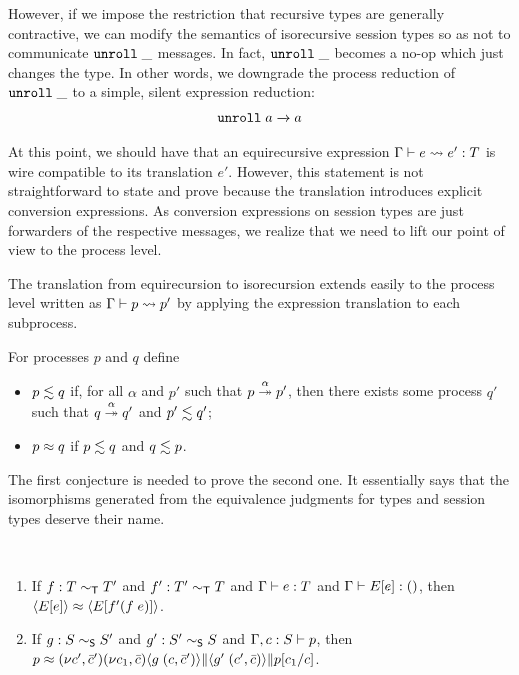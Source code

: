 However, if we impose the restriction that recursive types are
generally contractive, we can modify the semantics of isorecursive
session types so as not to communicate $\EUnroll\_$ messages. In fact,
$\EUnroll\_$ becomes a no-op which just changes the type. In other
words, we downgrade the process reduction of $\EUnroll\_$ to a simple,
silent expression reduction:
\begin{gather*}
  \reduce{\EUnroll a}{a}
\end{gather*}

At this point, we should have that an equirecursive expression
$\translation e{e'} T$ is wire compatible to its translation
$e'$. However, this statement is not straightforward to state and
prove because the translation introduces explicit conversion
expressions. As conversion expressions on session types are
just forwarders of the respective messages, we realize that we need to
lift our point of view to the process level.

The translation from equirecursion to isorecursion extends easily to
the process level written as $\Ptranslation p{p'}$ by applying the
expression translation to each subprocess.


\begin{definition}
  For processes $p$ and $q$ define
  \begin{itemize}
  \item $p \leftsim q$ if, for all $\alpha$ and $p'$ such that
    $\reducemany[\alpha] p{p'}$, then there exists some process $q'$
    such that $\reducemany[\alpha] q{q'}$ and $p' \leftsim q'$;
  \item $p \bisim q$ if $p \leftsim q$ and $q \leftsim p$.
  \end{itemize}
\end{definition}

The first conjecture is needed to prove the second one. It essentially
says that the isomorphisms generated from the equivalence judgments
for types and session types deserve their name.

\begin{conjecture}[Conversion]~
  \begin{enumerate}
  \item
    If $f : T \eqt T'$ and $f' : T' \eqt T$ and $\typing eT$ and
    $\typing {E[e]}\TUnit$, then 
    $\PExp{E[e]} \bisim \PExp{E[f' (f\;e)]}$.
  \item If $g : S \eqs S'$
    and $g' : S' \eqs S$
    and $\Ptyping[\Ctxt, c : S]p$, then\\
    $p \bisim
    \PScope[c', \bar c']\PScope[c_1, \bar c]
    \PPar{\PPar {\PExp{g \; (c, \bar c')}}{\PExp{g' \; (c', \bar c)}}}{p[c_1/c]}$.
  \end{enumerate}
\end{conjecture}

